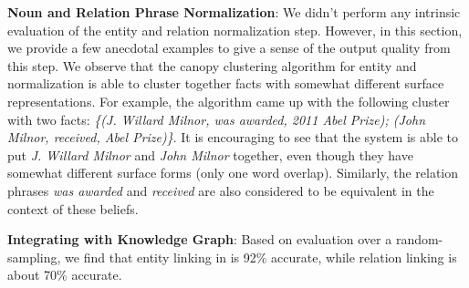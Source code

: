 {\bf Noun and Relation Phrase Normalization}: We didn't perform any intrinsic evaluation of the entity and relation normalization step. However, in this section, we provide a few anecdotal examples to give a sense of the output quality from this step. We observe that the canopy clustering algorithm for entity and normalization is able to cluster together facts with somewhat different surface representations. For example, the algorithm came up with the following cluster with two facts: \textit{ \{(J. Willard Milnor, was awarded, 2011 Abel Prize); (John Milnor, received, Abel Prize)\}}. It is encouraging to see that the system is able to put \textit{J. Willard Milnor} and \textit{John Milnor} together, even though they have somewhat different surface forms (only one word overlap). Similarly, the relation phrases \textit{was awarded} and \textit{received} are also considered to be equivalent in the context of these beliefs.
%

{\bf Integrating with Knowledge Graph}: Based on evaluation over a random-sampling, we find that entity linking in \system{} is 92\% accurate, while relation linking is about 70\% accurate.

